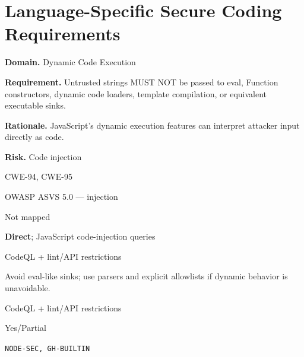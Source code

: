 \documentclass[10pt,letterpaper]{article}
\newcommand{\prioritybadge}[2]{\tcbox[on line,boxrule=0pt,arc=1.2mm,boxsep=0.7mm,left=1mm,right=1mm,top=0.4mm,bottom=0.4mm,colback=#2!12,coltext=#2]{\scriptsize\bfseries #1}}
\begin{document}
\section{Language-Specific Secure Coding Requirements}
\begin{rulebox}[title={\texttt{SCS-JS-DYN-001} \hfill \prioritybadge{Critical Control}{Critical}}]
\textbf{Domain.} Dynamic Code Execution

\textbf{Requirement.} Untrusted strings MUST NOT be passed to eval, Function constructors, dynamic code loaders, template compilation, or equivalent executable sinks.

\textbf{Rationale.} JavaScript's dynamic execution features can interpret attacker input directly as code.

\textbf{Risk.} Code injection

\begin{description}[leftmargin=2.65cm,labelwidth=2.3cm,style=nextline,itemsep=1pt,topsep=3pt]
  \item[CWE] CWE-94, CWE-95
  \item[OWASP] OWASP ASVS 5.0 --- injection
  \item[CERT] Not mapped
  \item[CodeQL] \textbf{Direct}; JavaScript code-injection queries
  \item[Enforcement] CodeQL + lint/API restrictions
  \item[Prevention] Avoid eval-like sinks; use parsers and explicit allowlists if dynamic behavior is unavoidable.
  \item[Verification] CodeQL + lint/API restrictions
  \item[Automation] Yes/Partial
  \item[Sources] \texttt{NODE-SEC, GH-BUILTIN}
\end{description}
\end{rulebox}
\end{document}
